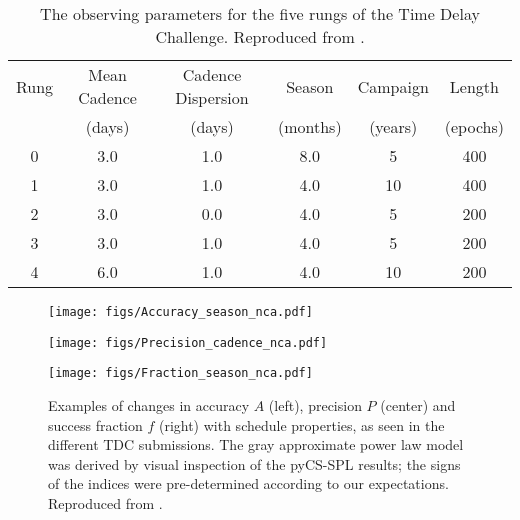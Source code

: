 \begin{table*}
\begin{center}
\capstart
\begin{tabular}{cccccc} \hline\hline
  Rung &  Mean Cadence & Cadence Dispersion & Season   & Campaign & Length   \\
       &  (days)       & (days)             & (months) & (years)  & (epochs) \\ \hline
  0    &    3.0        &   1.0              &   8.0    &    5     & 400      \\
  1    &    3.0        &   1.0              &   4.0    &    10    & 400      \\
  2    &    3.0        &   0.0              &   4.0    &    5     & 200      \\
  3    &    3.0        &   1.0              &   4.0    &    5     & 200      \\
  4    &    6.0        &   1.0              &   4.0    &    10    & 200      \\
\hline\hline
\end{tabular}
\end{center}
\caption{The observing parameters for the five rungs of the Time Delay
Challenge. Reproduced from \citet{LiaoEtal2015}.\label{tab:tdcrungs}}
\end{table*}

\begin{figure*}[!ht]
  \capstart
  \begin{minipage}[b]{\linewidth}
    \begin{minipage}[b]{0.32\linewidth}
      \centering\texttt{[image: figs/Accuracy\_season\_nca.pdf]}
    \end{minipage} \hfill
    \begin{minipage}[b]{0.32\linewidth}
      \centering\texttt{[image: figs/Precision\_cadence\_nca.pdf]}
    \end{minipage} \hfill
    \begin{minipage}[b]{0.32\linewidth}
      \centering\texttt{[image: figs/Fraction\_season\_nca.pdf]}
    \end{minipage}
  \end{minipage}
\caption{Examples of changes in accuracy $A$ (left), precision $P$
(center) and success fraction $f$ (right) with schedule properties, as
seen in the different TDC submissions. The gray approximate power law
model was derived by visual inspection of the pyCS-SPL results; the
signs of the indices were pre-determined according to our expectations.
Reproduced from \citet{LiaoEtal2015}.}
\label{fig:tdcresults}
\end{figure*}

